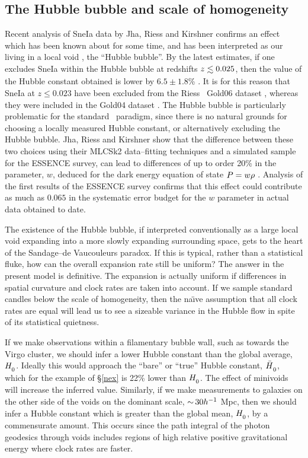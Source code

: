 \documentclass[12pt]{article}
\begin{document}
\subsection{The Hubble bubble and scale of homogeneity\label{bubble}}

Recent analysis of SneIa data by Jha, Riess and Kirshner \cite{JRK} confirms
an effect which has been known about for some time, and has been interpreted
as our living in a local void \cite{Tom1}, the ``Hubble bubble''. By the
latest estimates, if one excludes SneIa within the Hubble bubble at redshifts
$z\lsim0.025$, then the value of the Hubble constant obtained is lower by
$6.5\pm1.8$\% \cite{JRK}. It is for this reason that SneIa at $z\le0.023$ have
been excluded from the Riess \etal\ Gold06 dataset \cite{Riess06}, whereas
they were included in the Gold04 dataset \cite{Riess04}. The Hubble bubble
is particularly problematic for the standard \LCDM\ paradigm, since there is
no natural grounds for choosing a locally measured Hubble constant,
or alternatively excluding the Hubble bubble. Jha, Riess and Kirshner show
that the difference between these two choices using their MLCSk2 data--fitting
techniques and a simulated sample for the ESSENCE survey, can lead to
differences of up to order 20\% in the parameter, $w$, deduced for the
dark energy equation of state $P=w\rho$ \cite{JRK}. Analysis of the first
results of the ESSENCE survey \cite{essence} confirms that this effect could
contribute as much as $0.065$ in the systematic error budget for the $w$
parameter in actual data obtained to date.

The existence of the Hubble bubble, if interpreted conventionally as a large
local void expanding into a more slowly expanding surrounding space, gets
to the heart of the Sandage--de Vaucouleurs paradox. If this is typical, rather
than a statistical fluke, how can the overall expansion rate still be uniform?
The answer in the present model is definitive. The expansion is actually
uniform if differences in spatial curvature and clock rates are taken into
account. If we sample standard candles below the scale of homogeneity, then
the na\"{\i}ve assumption that all clock rates are equal will lead us to
see a sizeable variance in the Hubble flow in spite of its statistical
quietness.

If we make observations within a filamentary bubble wall, such as towards
the Virgo cluster, we should infer a lower Hubble constant than the global
average, $\Hm$. Ideally this would approach the ``bare'' or ``true'' Hubble
constant, $\Hb$, which for the example of \S\ref{nex} is 22\% lower than
$\Hm$. The effect of minivoids will increase the
inferred value. Similarly, if we make measurements to galaxies
on the other side of the voids on the dominant scale, $\mathop{\sim}\limits30h^{-1}$ Mpc,
then we should infer a Hubble constant which is greater than the global
mean, $\Hm$, by a commensurate amount. This occurs since the path integral
of the photon geodesics through voids includes regions of high relative
positive gravitational energy where clock rates are faster.
\end{document}
